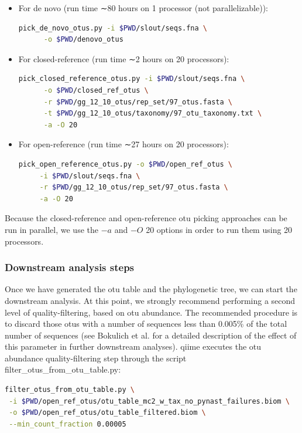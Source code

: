 \begin{itemize}
    \item For de novo (run time ∼80 hours on 1 processor (not parallelizable)):
    \begin{lstlisting}[language=bash]
    pick_de_novo_otus.py -i $PWD/slout/seqs.fna \
      -o $PWD/denovo_otus
    \end{lstlisting}
    \item For closed-reference (run time ∼2 hours on 20 processors):
    \begin{lstlisting}[language=bash]
    pick_closed_reference_otus.py -i $PWD/slout/seqs.fna \
      -o $PWD/closed_ref_otus \
      -r $PWD/gg_12_10_otus/rep_set/97_otus.fasta \
      -t $PWD/gg_12_10_otus/taxonomy/97_otu_taxonomy.txt \
      -a -O 20
    \end{lstlisting}
    \item For open-reference (run time ∼27 hours on 20 processors):
    \begin{lstlisting}[language=bash]
    pick_open_reference_otus.py -o $PWD/open_ref_otus \
     -i $PWD/slout/seqs.fna \
     -r $PWD/gg_12_10_otus/rep_set/97_otus.fasta \
     -a -O 20
    \end{lstlisting}
\end{itemize}


Because the closed-reference and open-reference \gls{otu} picking approaches can
be run in parallel, we use the $-a$ and $-O$ 20 options in order to run them using
20 processors.

\subsubsection{Downstream analysis steps}

Once we have generated the \gls{otu} table and the phylogenetic tree, we can start the
downstream analysis. At this point, we strongly recommend performing a second level
of quality-filtering, based on \gls{otu} abundance. The recommended procedure is to
discard those \gls{otu}s with a number of sequences less than 0.005\% of the total
number of sequences (see Bokulich et al. \cite{Bokulich2013} for a detailed description
of the effect of this parameter in further downstream analyses). \gls{qiime} executes the
\gls{otu} abundance quality-filtering step through the script filter\_otus\_from\_otu\_table.py:

\begin{lstlisting}[language=bash]
filter_otus_from_otu_table.py \
 -i $PWD/open_ref_otus/otu_table_mc2_w_tax_no_pynast_failures.biom \
 -o $PWD/open_ref_otus/otu_table_filtered.biom \
 --min_count_fraction 0.00005
\end{lstlisting}


